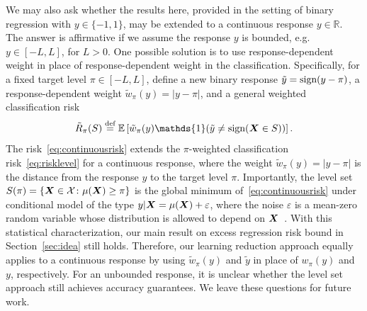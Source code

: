 \documentclass[11pt]{article}
\theoremstyle{plain}
\theoremstyle{definition}
\def\sign{\textup{sign}}
\begin{document}
We may also ask whether the results here, provided in the setting of binary regression with $y\in\{-1,1\}$, may be extended to a continuous response $y\in\mathbb{R}$. The answer is affirmative if we assume the response $y$ is bounded, e.g.\ $y\in[-L,L]$, for $L>0$. One possible solution is to use response-dependent weight in place of response-dependent weight in the classification. Specifically, for a fixed target level $\pi\in [-L,L]$, define a new binary response $\tilde y = \sign (y-\pi)$, a response-dependent weight $\tilde  w_\pi(y)=|y-\pi|$, and a general weighted classification risk
\begin{equation}\label{eq:continuousrisk}
\tilde R_\pi(S)\stackrel{\text{def}}{=}\mathbb{E}\left[\tilde  w_\pi(y)\mathds{1}(\tilde y \neq \sign (\mX\in S))\right].
\end{equation}
The risk~\eqref{eq:continuousrisk} extends the $\pi$-weighted classification risk~\eqref{eq:risklevel} for a continuous response, where the weight $\tilde  w_\pi(y)=|y-\pi|$ is the distance from the response $y$ to the target level $\pi$. Importantly, the level set $S(\pi)=\{\bm X\in \mathcal{X} \colon \mu(\bm X)\geq \pi\}$ is the global minimum of~\eqref{eq:continuousrisk} under conditional model of the type $y|\bm X=\mu(\bm X)+\varepsilon$, where the noise $\varepsilon$ is a mean-zero random variable whose distribution is allowed to depend on $\bm X$~\citep{willett2007minimax,scott2007regression}. With this statistical characterization, our main result on excess regression risk bound in Section~\ref{sec:idea} still holds. Therefore, our learning reduction approach equally applies to a continuous response by using $\tilde w_\pi(y)$ and $\tilde y$ in place of $w_\pi(y)$ and $y$, respectively. For an unbounded response, it is unclear whether the level set approach still achieves accuracy guarantees. We leave these questions for future work. 

\end{document}
